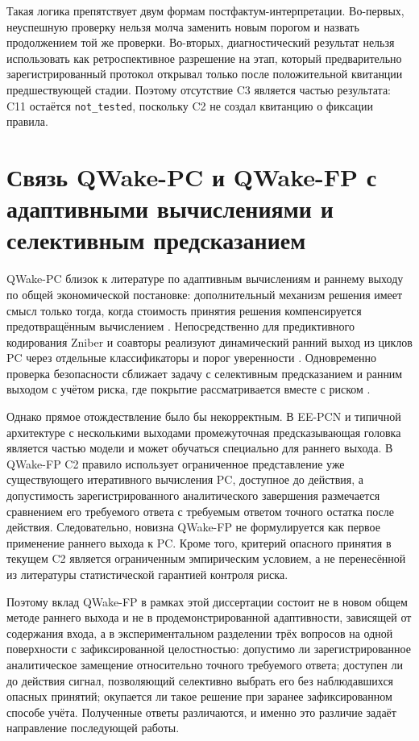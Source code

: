 Такая логика препятствует двум формам постфактум-интерпретации. Во-первых,
неуспешную проверку нельзя молча заменить новым порогом и назвать продолжением
той же проверки. Во-вторых, диагностический результат нельзя использовать как
ретроспективное разрешение на этап, который предварительно зарегистрированный
протокол открывал только после положительной квитанции предшествующей стадии.
Поэтому отсутствие C3 является частью результата: C11 остаётся
\texttt{not\_tested}, поскольку C2 не создал квитанцию о фиксации правила.

\section{Связь QWake-PC и QWake-FP с адаптивными вычислениями и селективным предсказанием}
\label{sec:discussion-related-qwake}

QWake-PC близок к литературе по адаптивным вычислениям и раннему выходу по общей
экономической постановке: дополнительный механизм решения имеет смысл только
тогда, когда стоимость принятия решения компенсируется предотвращённым
вычислением \cite{graves2016adaptive,bolukbasi2017adaptive}. Непосредственно для
предиктивного кодирования Zniber и соавторы реализуют динамический ранний выход
из циклов PC через отдельные классификаторы и порог уверенности
\cite{zniber2025earlyexit}. Одновременно
проверка безопасности сближает задачу с селективным предсказанием и ранним
выходом с учётом риска, где покрытие рассматривается вместе с риском
\cite{geifman2019selectivenet,jazbec2024riskcontrol,valade2025eero}.

Однако прямое отождествление было бы некорректным. В EE-PCN и типичной
архитектуре с несколькими выходами промежуточная предсказывающая головка является
частью модели и может обучаться специально для раннего выхода. В QWake-FP C2
правило использует ограниченное представление уже существующего итеративного
вычисления PC, доступное до действия, а допустимость зарегистрированного
аналитического завершения размечается сравнением его требуемого ответа с
требуемым ответом точного остатка после действия. Следовательно, новизна QWake-FP не формулируется как
первое применение раннего выхода к PC.
Кроме того, критерий опасного принятия в текущем C2 является ограниченным
эмпирическим условием, а не перенесённой из литературы статистической гарантией
контроля риска.

Поэтому вклад QWake-FP в рамках этой диссертации состоит не в новом общем методе
раннего выхода и не в продемонстрированной адаптивности, зависящей от содержания входа, а в
экспериментальном разделении трёх вопросов на одной поверхности с
зафиксированной целостностью: допустимо ли зарегистрированное аналитическое
замещение относительно точного требуемого ответа; доступен ли до действия
сигнал, позволяющий селективно выбрать его без наблюдавшихся опасных принятий;
окупается ли такое решение при заранее зафиксированном способе учёта. Полученные
ответы различаются, и именно это различие задаёт направление последующей
работы.

